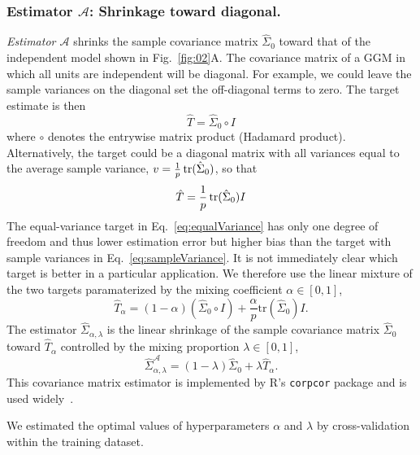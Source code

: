 \subsubsection*{Estimator $\mathcal A$: Shrinkage toward diagonal.}
\emph{Estimator $\mathcal A$} shrinks the sample covariance matrix $\hat\Sigma_0$ toward that of the independent model shown in Fig.~\ref{fig:02}A.  The covariance matrix of a GGM in which all units are independent will be diagonal.  
For example, we  could leave the sample variances on the diagonal set the off-diagonal terms to zero. The target estimate
is then 
\begin{equation}\label{eq:sampleVariance}
\hat T= \hat\Sigma_0\circ I
\end{equation}
where $\circ$ denotes the entrywise matrix product (Hadamard product). 
Alternatively, the target could be a diagonal matrix with all variances equal to the average sample variance, $v = \frac 1 p \operatorname{tr}(\hat\Sigma_0)$, so that
\begin{equation}\label{eq:equalVariance}
\hat T=\frac 1 p \operatorname{tr}(\hat\Sigma_0) I
\end{equation}
The equal-variance target in Eq.~\ref{eq:equalVariance} has only one degree of freedom and thus lower estimation error but higher bias than the target with sample variances in Eq.~\ref{eq:sampleVariance}. It is not immediately clear which target is better in a particular application. We therefore use the linear mixture of the two targets paramaterized by the mixing coefficient $\alpha\in[0,1]$,
\begin{equation}
\hat T_\alpha = (1-\alpha)(\hat\Sigma_0 \circ I) + \frac \alpha p \mbox{tr}(\hat \Sigma_0)I.
\end{equation}
The estimator $\hat\Sigma_{\alpha,\lambda}$ is the linear shrinkage of the sample covariance matrix $\hat\Sigma_0$ toward $\hat T_\alpha$ controlled by the mixing proportion $\lambda\in[0,1]$,
\begin{equation}
\hat\Sigma_{\alpha,\lambda}^\mathcal{A} = (1-\lambda)\hat\Sigma_0 + \lambda\hat T_\alpha.
\end{equation}
This covariance matrix estimator is implemented by R's {\tt corpcor} package \cite{Schaefer:2010} and is used widely~\cite{Schafer:2005}.

We estimated the optimal values of hyperparameters $ \alpha$ and $ \lambda$  by  cross-validation within the training dataset.  


